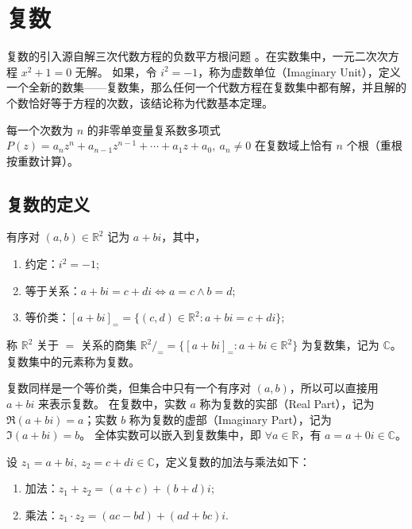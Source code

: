 \section{复数}
复数的引入源自解三次代数方程的负数平方根问题 。在实数集中，一元二次次方程 $x^2 + 1 = 0$ 无解。
如果，令 $i^2=-1$，称为虚数单位（Imaginary Unit），定义一个全新的数集——复数集，那么任何一个代数方程在复数集中都有解，并且解的个数恰好等于方程的次数，该结论称为代数基本定理。

\begin{theorem}
    每一个次数为 $n$ 的非零单变量复系数多项式 $P(z)=a_nz^n + a_{n-1}z^{n-1} + \cdots + a_1z + a_0,\ a_n\neq 0$ 在复数域上恰有 $n$ 个根（重根按重数计算）。
\end{theorem}

\vspace{1em}

\subsection{复数的定义}

\begin{definition} 有序对 $(a,b)\in\mathbb{R}^2$ 记为 $a+bi$，其中，
    \begin{enumerate}
        \item 约定：$i^2 = -1$;
        \item 等于关系：$a+bi = c+di \Leftrightarrow a=c \land b=d$;
        \item 等价类：$[a+bi]_{=} = \{(c,d)\in\mathbb{R}^2 : a+bi = c+di\}$;
    \end{enumerate}
    称 $\mathbb{R}^2$ 关于 $=$ 关系的商集 $\mathbb{R}^2/_{=}= \{[a+bi]_{=} : a+bi\in\mathbb{R}^2\}$ 为复数集，记为 $\mathbb{C}$。复数集中的元素称为复数。
\end{definition}

\begin{note}
    复数同样是一个等价类，但集合中只有一个有序对 $(a,b)$，所以可以直接用 $a+bi$ 来表示复数。
    在复数中，实数 $a$ 称为复数的实部（Real Part），记为 $\Re(a+bi)=a$；实数 $b$ 称为复数的虚部（Imaginary Part），记为 $\Im(a+bi)=b$。
    全体实数可以嵌入到复数集中，即 $\forall a\in\mathbb{R}$，有 $a =a+0i \in \mathbb{C}$。
\end{note}

\vspace{1em}

\begin{definition}
    设 $z_1=a+bi,\ z_2=c+di\in\mathbb{C}$，定义复数的加法与乘法如下：
    \begin{enumerate}
        \item 加法：$z_1 + z_2 = (a+c) + (b+d)i$;
        \item 乘法：$z_1 \cdot z_2 = (ac - bd) + (ad + bc)i$.
    \end{enumerate}
\end{definition}

